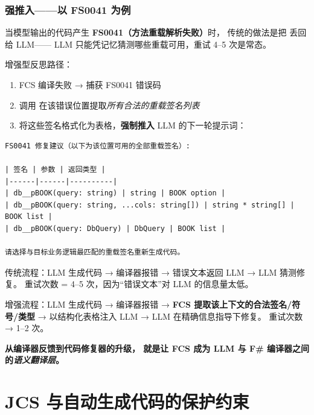 \documentclass[10pt, openany]{book}
\begin{document}
\subsection{\texorpdfstring{}{GetSemanticClassification} 强推入——以 FS0041 为例}

当模型输出的代码产生 \textbf{FS0041（方法重载解析失败）}时，
传统的做法是把  丢回给 LLM——
LLM 只能凭记忆猜测哪些重载可用，重试 4--5 次是常态。

增强型反思路径：

\begin{enumerate}
    \item FCS 编译失败 → 捕获 FS0041 错误码
    \item 调用  
        在该错误位置提取\emph{所有合法的重载签名列表}
    \item 将这些签名格式化为表格，\textbf{强制推入} LLM 的下一轮提示词：
\end{enumerate}

\begin{lstlisting}[style=cmd]
FS0041 修复建议（以下为该位置可用的全部重载签名）:

| 签名 | 参数 | 返回类型 |
|------|------|----------|
| db__pBOOK(query: string) | string | BOOK option |
| db__pBOOK(query: string, ...cols: string[]) | string * string[] | BOOK list |
| db__pBOOK(query: DbQuery) | DbQuery | BOOK list |

请选择与目标业务逻辑最匹配的重载签名重新生成代码。
\end{lstlisting}

\begin{principle}
    传统流程：LLM 生成代码 → 编译器报错 → 错误文本返回 LLM → LLM 猜测修复。
    重试次数 = 4--5 次，因为``错误文本''对 LLM 的信息量太低。
    
    增强流程：LLM 生成代码 → 编译器报错 → 
    \textbf{FCS 提取该上下文的合法签名/符号/类型} →
    以结构化表格注入 LLM → LLM 在精确信息指导下修复。
    重试次数 → 1--2 次。
    
    \textbf{从编译器反馈到代码修复器的升级，
    就是让 FCS 成为 LLM 与 F\# 编译器之间的\emph{语义翻译层}。}
\end{principle}

\chapter{JCS 与自动生成代码的保护约束}
\end{document}
